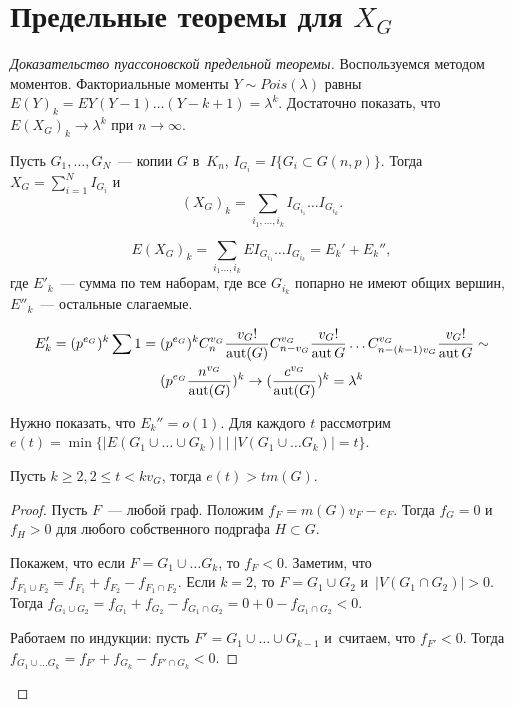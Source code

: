 \documentclass{article}
\begin{document}
\section{Предельные теоремы для $X_G$}

\begin{proof}[Доказательство пуассоновской предельной теоремы]
	Воспользуемся методом моментов. Факториальные моменты $Y \sim Pois(\lambda)$
	равны $E(Y)_k = EY(Y-1)\ldots(Y-k+1) = \lambda^k$. Достаточно показать, что
	$E(X_G)_k \rightarrow \lambda^k$ при $n \rightarrow \infty$.

	Пусть $G_1, \ldots, G_N$~--- копии $G$ в~$K_n$, $I_{G_i} = I\{G_i \subset G(n,
	p)\}$. Тогда $X_G = \sum\limits_{i=1}^N I_{G_i}$ и
	$$(X_G)_k = \sum\limits_{i_1,\ldots,i_k} I_{G_{i_1}} \ldots I_{G_{i_k}}.$$

	$$ E(X_G)_k = \sum\limits_{i_1\ldots,i_k} E I_{G_{i_1}} \ldots I_{G_{i_k}} =
	E_k' + E_k'',$$
	где $E'_k$~--- сумма по тем наборам, где все $G_{i_k}$ попарно не имеют общих
	вершин, $E''_k$~--- остальные слагаемые.

	\begin{multline*}
		E'_k = (p^{e_G})^k \sum 1 = (p^{e_G})^k C_n^{v_G} \frac{v_G!}{\operatorname{aut}(G)}
		C_{n-v_G}^{v_G} \frac{v_G!}{\operatorname{aut}{G}} \ldots C_{n-(k-1)v_G}^{v_G}
		\frac{v_G!}{\operatorname{aut}{G}} \sim \\
		(p^{e_G} \frac{n^{v_G}}{\operatorname{aut}(G)})^k \rightarrow
		(\frac{c^{v_G}}{\operatorname{aut}(G)})^k = \lambda^k
	\end{multline*}

	Нужно показать, что $E_k'' = o(1)$. Для каждого $t$ рассмотрим $e(t) =
	\min\{|E(G_1 \cup \ldots \cup G_k)| \mid |V(G_1 \cup \ldots G_k)| = t\}$.

	\begin{claim}
		Пусть $k \ge 2, 2 \le t < kv_G$, тогда $e(t) > t m(G)$.
	\end{claim}
	\begin{proof}
		Пусть $F$~--- любой граф. Положим $f_F = m(G)v_F - e_F$. Тогда $f_G = 0$
		и~$f_H > 0$ для любого собственного подргафа $H \subset G$.

		Покажем, что если $F = G_1 \cup \ldots G_k$, то $f_F < 0$. Заметим, что
		$f_{F_1 \cup F_2} = f_{F_1} + f_{F_2} - f_{F_1 \cap F_2}$. Если $k = 2$, то
		$F = G_1 \cup G_2$ и~$|V(G_1 \cap G_2)| > 0$. Тогда $f_{G_1 \cup G_2} =
		f_{G_1} + f_{G_2} - f_{G_1 \cap G_2} = 0 + 0 - f_{G_1 \cap G_2} < 0$.

		Работаем по индукции: пусть $F' = G_1 \cup \ldots \cup G_{k-1}$ и~считаем,
		что $f_{F'} < 0$. Тогда $f_{G_1 \cup \ldots G_k} = f_{F'} + f_{G_k} - f_{F'
		\cap G_k} < 0$.


\end{proof}
\end{proof}
\end{document}
